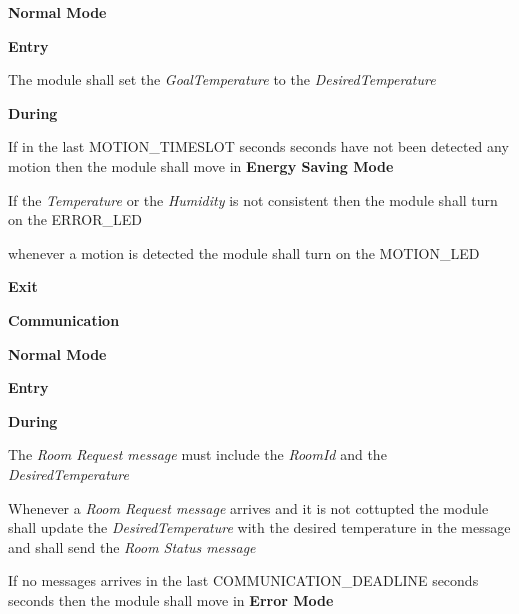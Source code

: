 \begin{req_enum}
\begin{req_enum}[label*=\arabic*.]
					\item \textbf{Normal Mode}
						\begin{req_enum}[label*=\arabic*.]
							\item \textbf{Entry}
								\begin{req_enum}[label*=\arabic*.]
									\item The module shall set the \textit{GoalTemperature} to the \textit{DesiredTemperature}
								\end{req_enum}
							\item \textbf{During}
								\begin{req_enum}[label*=\arabic*.]
									\item If in the last MOTION\_TIMESLOT seconds  seconds have not been detected any motion then the module shall move in \textbf{Energy Saving Mode}
									\item If the \textit{Temperature} or the \textit{Humidity} is not consistent then the module shall turn on the ERROR\_LED
									\item whenever a motion is detected the module shall turn on the MOTION\_LED
								\end{req_enum}

							\item \textbf{Exit}
						\end{req_enum}
				\end{req_enum}

			\item \textbf{Communication}
				\begin{req_enum}[label*=\arabic*.]
					\item \textbf{Normal Mode}
						\begin{req_enum}[label*=\arabic*.]
							\item \textbf{Entry}
							\item \textbf{During}
								\begin{req_enum}[label*=\arabic*.]
									\item The \textit{Room Request message} must include the \textit{RoomId} and the \textit{DesiredTemperature}
									\item Whenever a \textit{Room Request message} arrives and it is not cottupted the module shall update the \textit{DesiredTemperature} with the desired temperature in the message and shall send the \textit{Room Status message}
									\item If no messages arrives in the last COMMUNICATION\_DEADLINE seconds  seconds then the module shall move in \textbf{Error Mode}
								\end{req_enum}
	

\end{req_enum}
\end{req_enum}
\end{req_enum}

